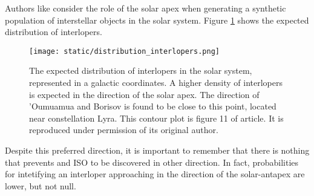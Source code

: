 Authors like \cite{marceta2023} consider the role of the solar apex when
generating a synthetic population of interstellar objects in the solar system.
Figure \ref{fig:distribution_interlopers} shows the expected distribution of
interlopers.

\vspace{1cm}

\begin{figure}[H]
  \centering
  \texttt{[image: static/distribution\_interlopers.png]}
  \caption[Expected interlopers distribution in the solar system.]{The
    expected distribution of interlopers in the solar system, represented in
    a galactic coordinates. A higher density of interlopers is expected in
    the direction of the solar apex. The direction of 'Oumuamua and Borisov
    is found to be close to this point, located near constellation Lyra.
    This contour plot is figure 11 of \cite{marceta2023} article. It is
    reproduced under permission of its original author.
  }
  \label{fig:distribution_interlopers}
\end{figure}

Despite this preferred direction, it is important to remember that there is
nothing that prevents and ISO to be discovered in other direction. In fact,
probabilities for intetifying an interloper approaching in the direction of the
solar-antapex are lower, but not null.
